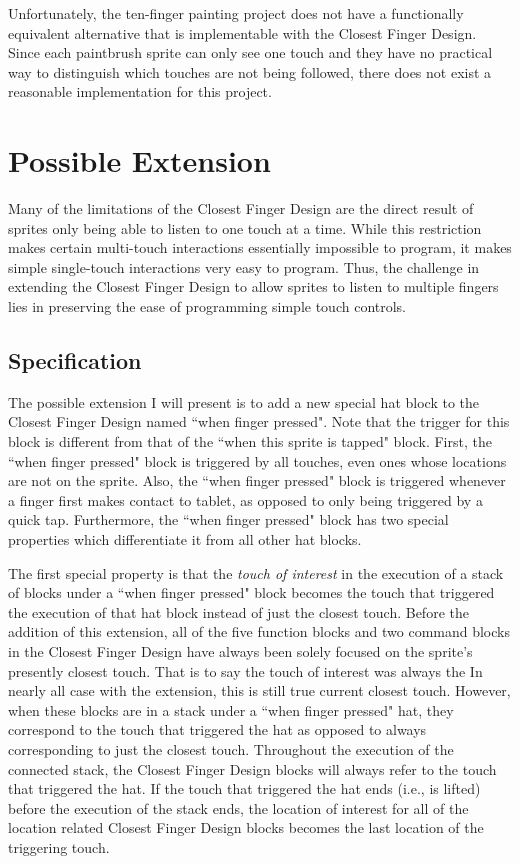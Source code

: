 Unfortunately, the ten-finger painting project does not have a functionally equivalent alternative that is implementable with the Closest Finger Design. Since each paintbrush sprite can only see one touch and they have no practical way to distinguish which touches are not being followed, there does not exist a reasonable implementation for this project.

\section{Possible Extension}

Many of the limitations of the Closest Finger Design are the direct result of sprites only being able to listen to one touch at a time. While this restriction makes certain multi-touch interactions essentially impossible to program, it makes simple single-touch interactions very easy to program. Thus, the challenge in extending the Closest Finger Design to allow sprites to listen to multiple fingers lies in preserving the ease of programming simple touch controls.

\subsection{Specification}
The possible extension I will present is to add a new special hat block to the Closest Finger Design named ``when finger pressed". Note that the trigger for this block is different from that of the ``when this sprite is tapped" block. First, the ``when finger pressed" block is triggered by all touches, even ones whose locations are not on the sprite. Also, the ``when finger pressed" block is triggered whenever a finger first makes contact to tablet, as opposed to only being triggered by a quick tap. Furthermore, the ``when finger pressed"  block has two special properties which differentiate it from all other hat blocks.

The first special property is that the \emph{touch of interest} in the execution of a stack of blocks under a ``when finger pressed" block becomes the touch that triggered the execution of that hat block instead of just the closest touch. Before the addition of this extension, all of the five function blocks and two command blocks in the Closest Finger Design have always been solely focused on the sprite's presently closest touch. That is to say the touch of interest was always the In nearly all case with the extension, this is still true current closest touch. However, when these blocks are in a stack under a ``when finger pressed" hat, they correspond to the touch that triggered the hat as opposed to always corresponding to just the closest touch. Throughout the execution of the connected stack, the Closest Finger Design blocks will always refer to the touch that triggered the hat. If the touch that triggered the hat ends (i.e., is lifted) before the execution of the stack ends, the location of interest for all of the location related Closest Finger Design blocks becomes the last location of the triggering touch. 

